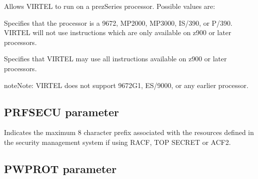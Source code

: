 \documentclass[letterpaper,10pt,english]{sphinxmanual}
\begin{document}
\sphinxAtStartPar
Allows VIRTEL to run on a pre\sphinxhyphen{}zSeries processor. Possible values are:

\sphinxAtStartPar
{} \sphinxhyphen{} Specifies that the processor is a 9672, MP2000, MP3000, IS/390, or P/390. VIRTEL will not use instructions which are only available on z900 or later processors.

\sphinxAtStartPar
{} \sphinxhyphen{} Specifies that VIRTEL may use all instructions available on z900 or later processors.

\begin{sphinxadmonition}{note}{Note:}
\sphinxAtStartPar
VIRTEL does not support 9672\sphinxhyphen{}G1, ES/9000, or any earlier processor.
\end{sphinxadmonition}

\ignorespaces 

\subsection{PRFSECU parameter}
\label{\detokenize{Installation_Guide:prfsecu-parameter}}\label{\detokenize{Installation_Guide:index-103}}
\begin{sphinxVerbatim}[commandchars=\\\{\}]
 
\end{sphinxVerbatim}

\sphinxAtStartPar
{} \sphinxhyphen{} Indicates the maximum 8 character prefix associated with the resources defined in the security management system if using RACF, TOP SECRET or ACF2.

\ignorespaces 

\subsection{PWPROT parameter}
\label{\detokenize{Installation_Guide:pwprot-parameter}}\label{\detokenize{Installation_Guide:index-104}}
\begin{sphinxVerbatim}[commandchars=\\\{\}]
 
\end{sphinxVerbatim}
\end{document}
